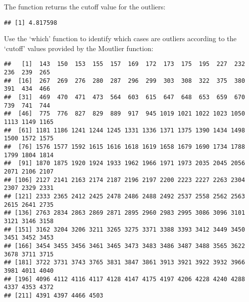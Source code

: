 \documentclass[
]{article}
\newenvironment{Shaded}{\begin{snugshade}}{\end{snugshade}}
\newcommand{\FunctionTok}[1]{\textcolor[rgb]{0.00,0.00,0.00}{#1}}
\newcommand{\NormalTok}[1]{#1}
\newcommand{\OtherTok}[1]{\textcolor[rgb]{0.56,0.35,0.01}{#1}}
\newcommand{\SpecialCharTok}[1]{\textcolor[rgb]{0.00,0.00,0.00}{#1}}
\begin{document}
The function returns the cutoff value for the outliers:

\begin{Shaded}
\end{Shaded}

\begin{verbatim}
## [1] 4.817598
\end{verbatim}

Use the `which' function to identify which cases are outliers according
to the `cutoff' values provided by the Moutlier function:

\begin{Shaded}
\end{Shaded}

\begin{verbatim}
##   [1]  143  150  153  155  157  169  172  173  175  195  227  232  236  239  265
##  [16]  267  269  276  280  287  296  299  303  308  322  375  380  391  434  466
##  [31]  469  470  471  473  564  603  615  647  648  653  659  670  739  741  744
##  [46]  775  776  827  829  889  917  945 1019 1021 1022 1023 1050 1113 1149 1165
##  [61] 1181 1186 1241 1244 1245 1331 1336 1371 1375 1390 1434 1498 1500 1572 1575
##  [76] 1576 1577 1592 1615 1616 1618 1619 1658 1679 1690 1734 1788 1799 1804 1814
##  [91] 1870 1875 1920 1924 1933 1962 1966 1971 1973 2035 2045 2056 2071 2106 2107
## [106] 2127 2141 2163 2174 2187 2196 2197 2200 2223 2227 2263 2304 2307 2329 2331
## [121] 2333 2365 2412 2425 2478 2486 2488 2492 2537 2558 2562 2563 2615 2641 2735
## [136] 2763 2834 2863 2869 2871 2895 2960 2983 2995 3086 3096 3101 3121 3146 3158
## [151] 3162 3204 3206 3211 3265 3275 3371 3388 3393 3412 3449 3450 3451 3452 3453
## [166] 3454 3455 3456 3461 3465 3473 3483 3486 3487 3488 3565 3622 3678 3711 3715
## [181] 3722 3731 3743 3765 3831 3847 3861 3913 3921 3922 3932 3966 3981 4011 4040
## [196] 4096 4112 4116 4117 4128 4147 4175 4197 4206 4228 4240 4288 4337 4353 4372
## [211] 4391 4397 4466 4503
\end{verbatim}
\end{document}
